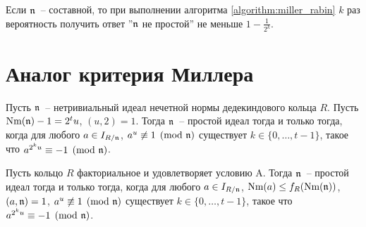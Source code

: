 \documentclass[_00_autoref.tex]{subfiles}
\begin{document}
\begin{remark}
    Если $\mathfrak{n}$~-- составной, то при выполнении алгоритма \ref{algorithm:miller_rabin} $k$ раз вероятность получить ответ ''$\mathfrak{n}$ не простой'' не меньше $1 - \frac{1}{2^k}$.
\end{remark}

\section{Аналог критерия Миллера}

\begin{theorem}\label{theorem:miller_criteria}
    Пусть $\mathfrak{n}$~-- нетривиальный идеал нечетной нормы дедекиндового кольца $R$.
    Пусть $\textrm{Nm}(\mathfrak{n}) - 1 = 2^t u$, $(u, 2) = 1$.
    Тогда $\mathfrak{n}$~-- простой идеал тогда и только тогда, когда для любого $a \in I_{R/\mathfrak{n}}$, $a^u \not\equiv 1 \pmod{\mathfrak{n}}$ существует $k\in \{0, \dots, t-1\}$, такое что $a^{2^{k}u} \equiv -1 \pmod{\mathfrak{n}}$.

    Пусть кольцо $R$ факториальное и удовлетворяет условию A.
    Тогда $\mathfrak{n}$~-- простой идеал тогда и только тогда, когда для любого $a \in I_{R/\mathfrak{n}}$, $\textrm{Nm}(a) \le f_R(\textrm{Nm}(\mathfrak{n}))$, $(a, \mathfrak{n}) = 1$, $a^u \not\equiv 1 \pmod{\mathfrak{n}}$ существует $k\in \{0, \dots, t-1\}$, такое что $a^{2^{k}u} \equiv -1 \pmod{\mathfrak{n}}$.
\end{theorem}
\end{document}

